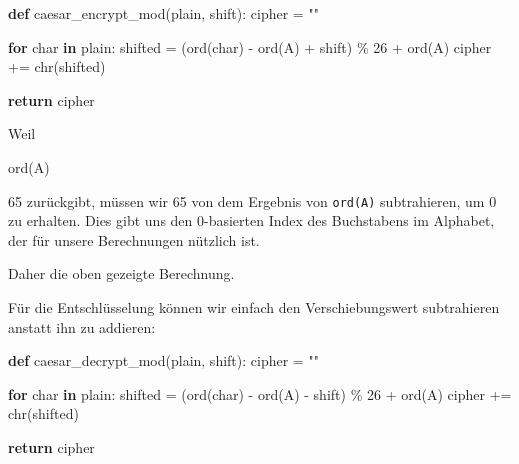 \documentclass[
  nswissgerman,
  a4paper,
  DIV=11,
  numbers=noendperiod,
  ngerman]{scrreprt}
\newenvironment{Shaded}{\begin{snugshade}}{\end{snugshade}}
\newcommand{\BuiltInTok}[1]{\textcolor[rgb]{0.00,0.23,0.31}{#1}}
\newcommand{\ControlFlowTok}[1]{\textcolor[rgb]{0.00,0.23,0.31}{\textbf{#1}}}
\newcommand{\DecValTok}[1]{\textcolor[rgb]{0.68,0.00,0.00}{#1}}
\newcommand{\KeywordTok}[1]{\textcolor[rgb]{0.00,0.23,0.31}{\textbf{#1}}}
\newcommand{\NormalTok}[1]{\textcolor[rgb]{0.00,0.23,0.31}{#1}}
\newcommand{\OperatorTok}[1]{\textcolor[rgb]{0.37,0.37,0.37}{#1}}
\newcommand{\StringTok}[1]{\textcolor[rgb]{0.13,0.47,0.30}{#1}}
\begin{document}
\begin{Shaded}
\begin{Highlighting}[numbers=left,,]
\KeywordTok{def}\NormalTok{ caesar\_encrypt\_mod(plain, shift):}
\NormalTok{    cipher }\OperatorTok{=} \StringTok{""}
    
    \ControlFlowTok{for}\NormalTok{ char }\KeywordTok{in}\NormalTok{ plain:}
\NormalTok{        shifted }\OperatorTok{=}\NormalTok{ (}\BuiltInTok{ord}\NormalTok{(char) }\OperatorTok{{-}} \BuiltInTok{ord}\NormalTok{(}\StringTok{\textquotesingle{}A\textquotesingle{}}\NormalTok{) }\OperatorTok{+}\NormalTok{ shift) }\OperatorTok{\%} \DecValTok{26} \OperatorTok{+} \BuiltInTok{ord}\NormalTok{(}\StringTok{\textquotesingle{}A\textquotesingle{}}\NormalTok{)}
\NormalTok{        cipher }\OperatorTok{+=} \BuiltInTok{chr}\NormalTok{(shifted)}
        
    \ControlFlowTok{return}\NormalTok{ cipher}
\end{Highlighting}
\end{Shaded}

Weil

\begin{Shaded}
\begin{Highlighting}[numbers=left,,]
\BuiltInTok{ord}\NormalTok{(}\StringTok{\textquotesingle{}A\textquotesingle{}}\NormalTok{)}
\end{Highlighting}
\end{Shaded}

65 zurückgibt, müssen wir 65 von dem Ergebnis von
\texttt{ord(\textquotesingle{}A\textquotesingle{})} subtrahieren, um 0
zu erhalten. Dies gibt uns den 0-basierten Index des Buchstabens im
Alphabet, der für unsere Berechnungen nützlich ist.

Daher die oben gezeigte Berechnung.

Für die Entschlüsselung können wir einfach den Verschiebungswert
subtrahieren anstatt ihn zu addieren:

\begin{Shaded}
\begin{Highlighting}[numbers=left,,]
\KeywordTok{def}\NormalTok{ caesar\_decrypt\_mod(plain, shift):}
\NormalTok{    cipher }\OperatorTok{=} \StringTok{""}
    
    \ControlFlowTok{for}\NormalTok{ char }\KeywordTok{in}\NormalTok{ plain:}
\NormalTok{        shifted }\OperatorTok{=}\NormalTok{ (}\BuiltInTok{ord}\NormalTok{(char) }\OperatorTok{{-}} \BuiltInTok{ord}\NormalTok{(}\StringTok{\textquotesingle{}A\textquotesingle{}}\NormalTok{) }\OperatorTok{{-}}\NormalTok{ shift) }\OperatorTok{\%} \DecValTok{26} \OperatorTok{+} \BuiltInTok{ord}\NormalTok{(}\StringTok{\textquotesingle{}A\textquotesingle{}}\NormalTok{)}
\NormalTok{        cipher }\OperatorTok{+=} \BuiltInTok{chr}\NormalTok{(shifted)}
        
    \ControlFlowTok{return}\NormalTok{ cipher}
\end{Highlighting}
\end{Shaded}
\end{document}
